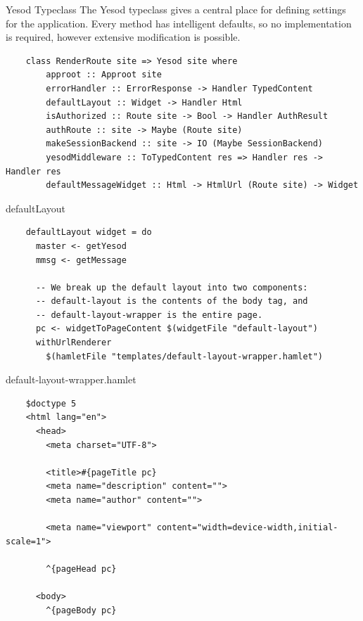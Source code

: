 \documentclass[pdf]{beamer}
\begin{document}
\begin{frame}[fragile]{Yesod Typeclass}
  The Yesod typeclass gives a central place for defining settings for
  the application. Every method has intelligent defaults, so no
  implementation is required, however extensive modification is
  possible.

  \begin{verbatim}
    class RenderRoute site => Yesod site where
        approot :: Approot site
        errorHandler :: ErrorResponse -> Handler TypedContent
        defaultLayout :: Widget -> Handler Html
        isAuthorized :: Route site -> Bool -> Handler AuthResult
        authRoute :: site -> Maybe (Route site)
        makeSessionBackend :: site -> IO (Maybe SessionBackend)
        yesodMiddleware :: ToTypedContent res => Handler res -> Handler res
        defaultMessageWidget :: Html -> HtmlUrl (Route site) -> Widget
  \end{verbatim}
\end{frame}

\begin{frame}[fragile]{defaultLayout}
  \begin{verbatim}
    defaultLayout widget = do
      master <- getYesod
      mmsg <- getMessage

      -- We break up the default layout into two components:
      -- default-layout is the contents of the body tag, and
      -- default-layout-wrapper is the entire page.
      pc <- widgetToPageContent $(widgetFile "default-layout")
      withUrlRenderer
        $(hamletFile "templates/default-layout-wrapper.hamlet")
  \end{verbatim}
\end{frame}

\begin{frame}[fragile]{default-layout-wrapper.hamlet}
  \begin{verbatim}
    $doctype 5
    <html lang="en">
      <head>
        <meta charset="UTF-8">

        <title>#{pageTitle pc}
        <meta name="description" content="">
        <meta name="author" content="">

        <meta name="viewport" content="width=device-width,initial-scale=1">

        ^{pageHead pc}

      <body>
        ^{pageBody pc}
  \end{verbatim}
\end{frame}
\end{document}
